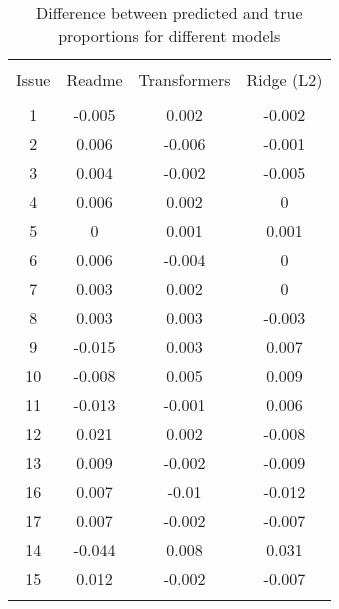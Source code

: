 
\begin{table}[!htbp] \centering 
  \caption{Difference between predicted and true proportions for different models} 
  \label{tab:aggregated-eval} 
\begin{tabular}{@{\extracolsep{5pt}} cccc} 
\\[-1.8ex]\hline 
\hline \\[-1.8ex] 
Issue & Readme & Transformers & Ridge (L2) \\ 
\hline \\[-1.8ex] 
1 & -0.005 & 0.002 & -0.002 \\ 
2 & 0.006 & -0.006 & -0.001 \\ 
3 & 0.004 & -0.002 & -0.005 \\ 
4 & 0.006 & 0.002 & 0 \\ 
5 & 0 & 0.001 & 0.001 \\ 
6 & 0.006 & -0.004 & 0 \\ 
7 & 0.003 & 0.002 & 0 \\ 
8 & 0.003 & 0.003 & -0.003 \\ 
9 & -0.015 & 0.003 & 0.007 \\ 
10 & -0.008 & 0.005 & 0.009 \\ 
11 & -0.013 & -0.001 & 0.006 \\ 
12 & 0.021 & 0.002 & -0.008 \\ 
13 & 0.009 & -0.002 & -0.009 \\ 
16 & 0.007 & -0.01 & -0.012 \\ 
17 & 0.007 & -0.002 & -0.007 \\ 
14 & -0.044 & 0.008 & 0.031 \\ 
15 & 0.012 & -0.002 & -0.007 \\ 
\hline \\[-1.8ex] 
\end{tabular} 
\end{table} 
